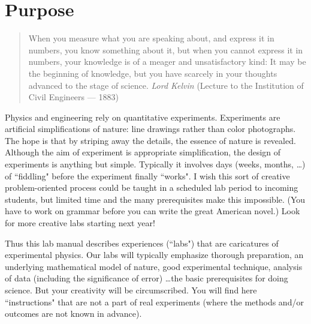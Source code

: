\newapp
\section*{Purpose}
\label{section:purpose}
\begin{quote}
When you measure what you are speaking about, and express it in numbers,
you know something about it, but when you cannot express it in numbers,
your knowledge is of a meager and unsatisfactory kind: It may be the beginning 
of knowledge, but you have scarcely in your thoughts advanced to
the stage of science.  {\em Lord Kelvin} (Lecture to the Institution of Civil Engineers --- 1883)
\end{quote}


Physics and engineering rely on quantitative experiments.
Experiments are artificial simplifications of nature:
line drawings rather than color photographs.  The hope is that by striping away
the details, the essence of nature is revealed.  
Although the aim of experiment is appropriate 
simplification, the design of experiments is anything but simple.
Typically it involves days (weeks, months, \ldots) of ``fiddling"
before the experiment finally ``works".  I wish this sort of creative
problem-oriented process
could be taught in a scheduled lab period to incoming students,
but limited time and the many prerequisites make this impossible.
(You have to work on grammar before you can write the great American
novel.)  Look for more creative labs starting next year!


Thus this lab manual describes experiences (``labs")
that are caricatures of experimental physics.
Our labs will typically 
emphasize thorough preparation, an underlying mathematical
model of nature, good experimental technique, analysis
of data (including the significance of error)
\ldots the basic prerequisites for doing science.
But your creativity will be circumscribed.  You will find here ``instructions"
that are not a part of real experiments (where the methods and/or  outcomes
are not known in advance).  

